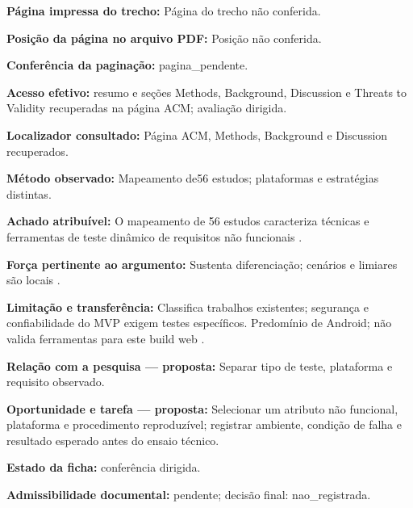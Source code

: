 \noindent\textbf{Página impressa do trecho:} Página do trecho não conferida.\par\medskip

\noindent\textbf{Posição da página no arquivo PDF:} Posição não conferida.\par\medskip

\noindent\textbf{Conferência da paginação:} pagina\_pendente.\par\medskip

\noindent\textbf{Acesso efetivo:} resumo e seções Methods, Background, Discussion e Threats to Validity recuperadas na página ACM; avaliação dirigida.\par\medskip

\noindent\textbf{Localizador consultado:} Página ACM, Methods, Background e Discussion recuperados.\par\medskip

\noindent\textbf{Método observado:} Mapeamento de56 estudos; plataformas e estratégias distintas.\par\medskip

\noindent\textbf{Achado atribuível:} O mapeamento de 56 estudos caracteriza técnicas e ferramentas de teste dinâmico de requisitos não funcionais \citep{eng06}.\par\medskip

\noindent\textbf{Força pertinente ao argumento:} Sustenta diferenciação; cenários e limiares são locais \citep{eng06}.\par\medskip

\noindent\textbf{Limitação e transferência:} Classifica trabalhos existentes; segurança e confiabilidade do MVP exigem testes específicos. Predomínio de Android; não valida ferramentas para este build web \citep{eng06}.\par\medskip

\noindent\textbf{Relação com a pesquisa — proposta:} Separar tipo de teste, plataforma e requisito observado.\par\medskip

\noindent\textbf{Oportunidade e tarefa — proposta:} Selecionar um atributo não funcional, plataforma e procedimento reproduzível; registrar ambiente, condição de falha e resultado esperado antes do ensaio técnico.\par\medskip

\noindent\textbf{Estado da ficha:} conferência dirigida.\par\medskip

\noindent\textbf{Admissibilidade documental:} pendente; decisão final: nao\_registrada.\par\medskip

